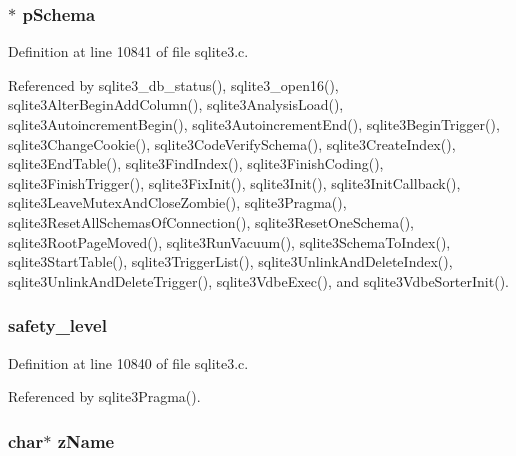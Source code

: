 \hypertarget{struct_db_ac262c2ca980f0326edbe82bbe7fda205}{}
\subsubsection[{p\+Schema}]{$\ast$ p\+Schema}\label{struct_db_ac262c2ca980f0326edbe82bbe7fda205}


Definition at line 10841 of file sqlite3.\+c.



Referenced by sqlite3\+\_\+db\+\_\+status(), sqlite3\+\_\+open16(), sqlite3\+Alter\+Begin\+Add\+Column(), sqlite3\+Analysis\+Load(), sqlite3\+Autoincrement\+Begin(), sqlite3\+Autoincrement\+End(), sqlite3\+Begin\+Trigger(), sqlite3\+Change\+Cookie(), sqlite3\+Code\+Verify\+Schema(), sqlite3\+Create\+Index(), sqlite3\+End\+Table(), sqlite3\+Find\+Index(), sqlite3\+Finish\+Coding(), sqlite3\+Finish\+Trigger(), sqlite3\+Fix\+Init(), sqlite3\+Init(), sqlite3\+Init\+Callback(), sqlite3\+Leave\+Mutex\+And\+Close\+Zombie(), sqlite3\+Pragma(), sqlite3\+Reset\+All\+Schemas\+Of\+Connection(), sqlite3\+Reset\+One\+Schema(), sqlite3\+Root\+Page\+Moved(), sqlite3\+Run\+Vacuum(), sqlite3\+Schema\+To\+Index(), sqlite3\+Start\+Table(), sqlite3\+Trigger\+List(), sqlite3\+Unlink\+And\+Delete\+Index(), sqlite3\+Unlink\+And\+Delete\+Trigger(), sqlite3\+Vdbe\+Exec(), and sqlite3\+Vdbe\+Sorter\+Init().

\hypertarget{struct_db_aec9729b84d983b099331a5ae74ee9864}{}
\subsubsection[{safety\+\_\+level}]{ safety\+\_\+level}\label{struct_db_aec9729b84d983b099331a5ae74ee9864}


Definition at line 10840 of file sqlite3.\+c.



Referenced by sqlite3\+Pragma().

\hypertarget{struct_db_a661118d86ac4127d40bf3be78d92117d}{}
\subsubsection[{z\+Name}]{\setlength{\rightskip}{0pt plus 5cm}char$\ast$ z\+Name}\label{struct_db_a661118d86ac4127d40bf3be78d92117d}


